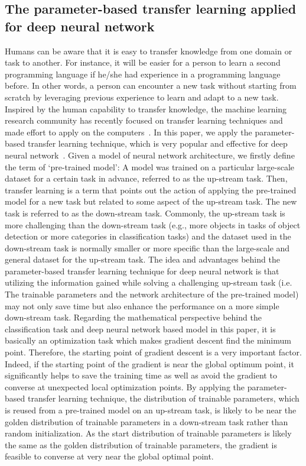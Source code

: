 \documentclass[sigconf]{acmart}
\begin{document}
\subsection{The parameter-based transfer learning applied for deep neural network}
\label{transfer}
Humans can be aware that it is easy to transfer knowledge from one domain or task to another. 
For instance, it will be easier for a person to learn a second programming language if he/she had experience in a programming language before.
In other words, a person can encounter a new task without starting from scratch by leveraging previous experience to learn and adapt to a new task.
Inspired by the human capability to transfer knowledge, the machine learning research community has recently focused on transfer learning techniques and made effort to apply on the computers~\cite{survey_transfer, survey_transfer_02}.
In this paper, we apply the parameter-based transfer learning technique, which is very popular and effective for deep neural network~\cite{pires2019convolutional}. 
Given a model of neural network architecture, we firstly define the term of `pre-trained model': A model was trained on a particular large-scale dataset for a certain task in advance, referred to as the up-stream task.
Then, transfer learning is a term that points out the action of applying the pre-trained model for a new task but related to some aspect of the up-stream task. 
The new task is referred to as the down-stream task.
Commonly, the up-stream task is more challenging than the down-stream task (e.g., more objects in tasks of object detection or more categories in classification tasks) and the dataset used in the down-stream task is normally smaller or more specific than the large-scale and general dataset for the up-stream task. 
The idea and advantages behind the parameter-based transfer learning technique for deep neural network is that utilizing the information gained while solving a challenging up-stream task (i.e. The trainable parameters and the network architecture of the pre-trained model) may not only save time but also enhance the performance on a more simple down-stream task.
Regarding the mathematical perspective behind the classification task and deep neural network based model in this paper, it is basically an optimization task which makes gradient descent find the minimum point.
Therefore, the starting point of gradient descent is a very important factor.
Indeed, if the starting point of the gradient is near the global optimum point, it significantly helps to save the training time as well as avoid the gradient to converse at unexpected local optimization points.
By applying the parameter-based transfer learning technique, the distribution of trainable parameters, which is reused from a pre-trained model on an up-stream task, is likely to be near the golden distribution of trainable parameters in a down-stream task rather than random initialization. 
As the start distribution of trainable parameters is likely the same as the golden distribution of trainable parameters, the gradient is feasible to converse at very near the global optimal point. 
\end{document}
